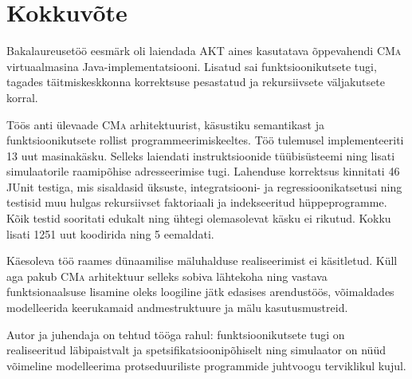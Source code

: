 ﻿\section*{Kokkuvõte}\label{kokkuvote} 

Bakalaureusetöö eesmärk oli laiendada AKT aines kasutatava õppevahendi \textsc{CMa} virtuaalmasina Java-implementatsiooni. Lisatud sai funktsioonikutsete tugi, tagades täitmiskeskkonna korrektsuse pesastatud ja rekursiivsete väljakutsete korral.

Töös anti ülevaade \textsc{CMa} arhitektuurist, käsustiku semantikast ja funktsioonikutsete rollist programmeerimiskeeltes. Töö tulemusel implementeeriti 13 uut masinakäsku. Selleks laiendati instruktsioonide tüübisüsteemi ning lisati simulaatorile raamipõhise adresseerimise tugi. Lahenduse korrektsus kinnitati 46 JUnit testiga, mis sisaldasid üksuste, integratsiooni- ja regressioonikatsetusi ning testisid muu hulgas rekursiivset faktoriaali ja indekseeritud hüppeprogramme. Kõik testid sooritati edukalt ning ühtegi olemasolevat käsku ei rikutud. Kokku lisati 1251 uut koodirida ning 5 eemaldati.

Käesoleva töö raames dünaamilise mäluhalduse realiseerimist ei käsitletud. Küll aga pakub \textsc{CMa} arhitektuur selleks sobiva lähtekoha ning vastava funktsionaalsuse lisamine oleks loogiline jätk edasises arendustöös, võimaldades modelleerida keerukamaid andmestruktuure ja mälu kasutusmustreid.

Autor ja juhendaja on tehtud tööga rahul: funktsioonikutsete tugi on realiseeritud läbipaistvalt ja spetsifikatsioonipõhiselt ning simulaator on nüüd võimeline modelleerima protseduuriliste programmide juhtvoogu terviklikul kujul.